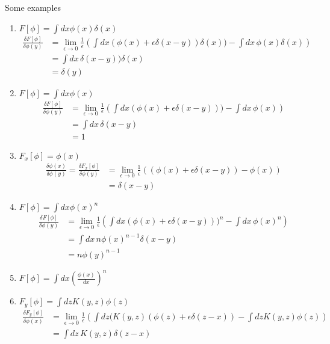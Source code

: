 \documentclass[10pt,a4paper]{book}
\theoremstyle{definition}
\begin{document}
Some examples
\begin{enumerate}
    \item $F[\phi]=\int dx \phi(x)\delta(x)$
    \begin{align}
        \frac{\delta F[\phi]}{\delta\phi(y)}
           &=\lim_{\epsilon\rightarrow0}\frac{1}{\epsilon}\left(\int dx(\phi(x)+\epsilon\delta(x-y))\delta(x))-\int
        dx\,\phi(x)\delta(x)\right)\\
        &=\int dx\,\delta(x-y))\delta(x)\\
       &=\delta(y)
    \end{align}
    \item $F[\phi]=\int dx \phi(x)$
    \begin{align}
        \frac{\delta F[\phi]}{\delta\phi(y)}
        &=\lim_{\epsilon\rightarrow0}\frac{1}{\epsilon}\left(\int dx(\phi(x)+\epsilon\delta(x-y)))-\int dx\,\phi(x)\right)\\
        &=\int dx\,\delta(x-y)\\
        &=1
    \end{align}
    \item $F_x[\phi]=\phi(x)$
    \begin{align}
        \frac{\delta \phi(x)}{\delta\phi(y)}=\frac{\delta F_x[\phi]}{\delta\phi(y)}
        &=\lim_{\epsilon\rightarrow0}\frac{1}{\epsilon}\left((\phi(x)+\epsilon\delta(x-y))-\phi(x)\right)\\
        &=\delta(x-y)
    \end{align}
    \item $F[\phi]=\int dx \phi(x)^n$
    \begin{align}
        \frac{\delta F[\phi]}{\delta\phi(y)}
        &=\lim_{\epsilon\rightarrow0}\frac{1}{\epsilon}\left(\int dx(\phi(x)+\epsilon\delta(x-y)))^n-\int dx\,\phi(x)^n\right)\\
        &=\int dx\,n\phi(x)^{n-1}\delta(x-y)\\
        &=n\phi(y)^{n-1}
    \end{align}
    \item $F[\phi]=\int dx \left(\frac{\phi(x)}{dx}\right)^n$
    \item $F_y[\phi]=\int dz K(y,z)\phi(z)$
    \begin{align}
        \frac{\delta F_y[\phi]}{\delta\phi(x)}
           &=\lim_{\epsilon\rightarrow0}\frac{1}{\epsilon}\left(\int dz(K(y,z)(\phi(z)+\epsilon\delta(z-x)) -\int dz K(y,z)\phi(z)\right)\\
           &=\int dz\,K(y,z)\delta(z-x)\\

\end{align}
\end{enumerate}
\end{document}
